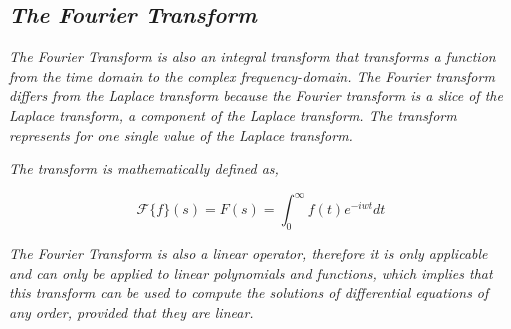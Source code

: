 

\subsection{\textit{The Fourier Transform}}

	\textit{The Fourier Transform is also an integral transform that transforms a function from the time domain to the complex frequency-domain. The Fourier transform differs from the Laplace transform because the Fourier transform is a slice of the Laplace transform, a component of the Laplace transform. The transform represents for one single value of the Laplace transform.}

	\textit{The transform is mathematically defined as,}

		$$\mathcal{F}\{f\}(s) = F(s) = \int_0^{\infty}f(t)e^{-iwt} dt$$

	\textit{The Fourier Transform is also a linear operator, therefore it is only applicable and can only be applied to linear polynomials and functions, which implies that this transform can be used to compute the solutions of differential equations of any order, provided that they are linear.}

